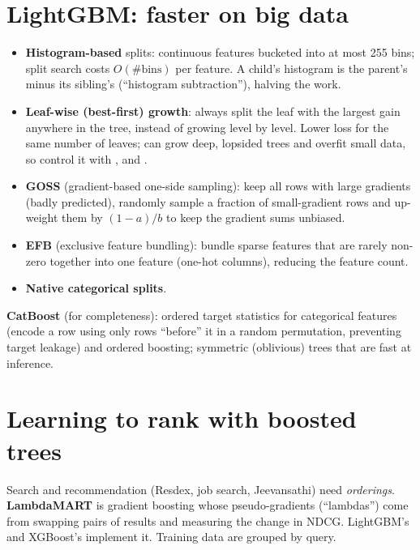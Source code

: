\section{LightGBM: faster on big data}
\begin{itemize}
\item \textbf{Histogram-based} splits: continuous features bucketed into at most 255 bins; split search costs $O(\#\text{bins})$ per
  feature. A child's histogram is the parent's minus its sibling's (``histogram subtraction''), halving the work.
\item \textbf{Leaf-wise (best-first) growth}: always split the leaf with the largest gain anywhere in the tree, instead of growing
  level by level. Lower loss for the same number of leaves; can grow deep, lopsided trees and overfit small data, so control it with
  ,  and .
\item \textbf{GOSS} (gradient-based one-side sampling): keep all rows with large gradients (badly predicted), randomly sample a
  fraction of small-gradient rows and up-weight them by $(1-a)/b$ to keep the gradient sums unbiased.
\item \textbf{EFB} (exclusive feature bundling): bundle sparse features that are rarely non-zero together into one feature
  (one-hot columns), reducing the feature count.
\item \textbf{Native categorical splits}.
\end{itemize}
\textbf{CatBoost} (for completeness): ordered target statistics for categorical features (encode a row using only rows ``before'' it in
a random permutation, preventing target leakage) and ordered boosting; symmetric (oblivious) trees that are fast at inference.

\section{Learning to rank with boosted trees}
Search and recommendation (Resdex, job search, Jeevansathi) need \emph{orderings}. \textbf{LambdaMART} is gradient boosting whose
pseudo-gradients (``lambdas'') come from swapping pairs of results and measuring the change in NDCG. LightGBM's
 and XGBoost's  implement it. Training data are grouped by query.

